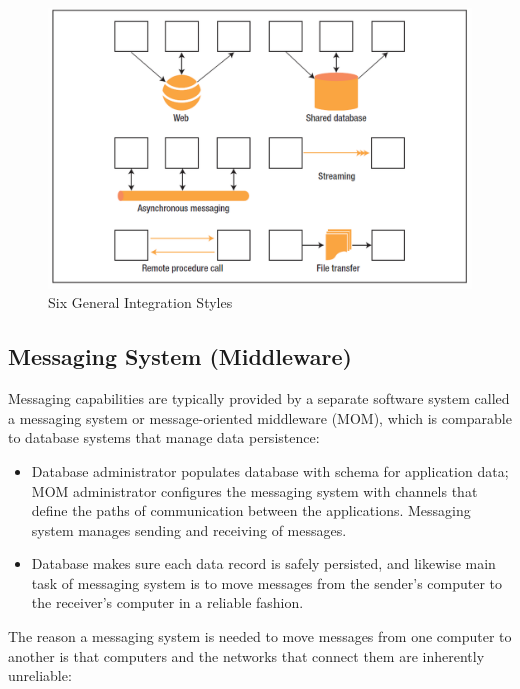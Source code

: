 \documentclass[../Main.tex]{subfiles}
\begin{document}
\begin{figure}[H]
    \centering
    \includegraphics[width=0.75\linewidth]{Images/general-integration-styles.png}
    \caption{Six General Integration Styles}
\end{figure}

\subsection{Messaging System (Middleware)}
Messaging capabilities are typically provided by a separate software system called a messaging system or 
message-oriented middleware (MOM), which is comparable to database systems that manage data 
persistence:
\begin{itemize}
    \item Database administrator populates database with schema for application data; MOM administrator 
    configures the messaging system with channels that define the paths of communication between the 
    applications. Messaging system manages sending and receiving of messages.
    \item Database makes sure each data record is safely persisted, and likewise main task of messaging system 
    is to move messages from the sender's computer to the receiver's computer in a reliable fashion.
\end{itemize}
The reason a messaging system is needed to move messages from one computer to 
another is that computers and the networks that connect them are inherently unreliable:
\end{document}
